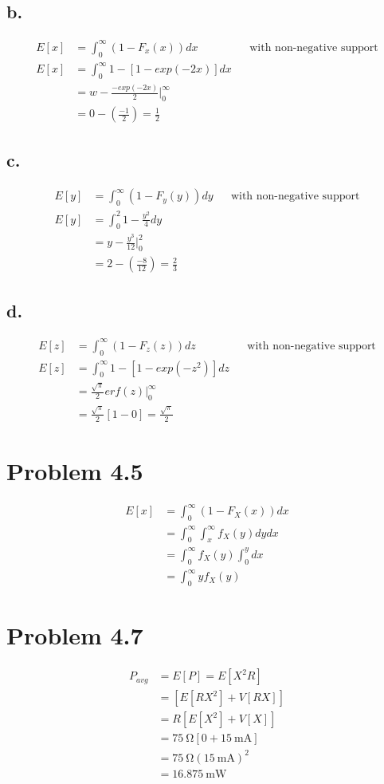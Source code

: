 \documentclass[12pt]{article}
\begin{document}
\subsection*{b.}
\begin{align*}
  E[x] &= \int_0^\infty (1-F_x(x))dx & & \textrm{with non-negative support} \\
  E[x] &= \int_0^\infty 1-[1-exp(-2x)]dx \\
  &= w - \frac{-exp(-2x)}{2}\big|_0^\infty \\
  &= 0 - (\frac{-1}{2}) = \frac{1}{2}
\end{align*}

\subsection*{c.}
\begin{align*}
  E[y] &= \int_0^\infty (1-F_y(y))dy & & \textrm{with non-negative support} \\
  E[y] &= \int_0^2 1-\frac{y^2}{4} dy \\
  &= y - \frac{y^3}{12}\big|_0^2 \\
  &= 2 - (\frac{-8}{12}) = \frac{2}{3}
\end{align*}

\subsection*{d.}
\begin{align*}
  E[z] &= \int_0^\infty (1-F_z(z))dz & & \textrm{with non-negative support} \\
  E[z] &= \int_0^\infty 1-[1-exp(-z^2)]dz \\
  &= \frac{\sqrt{\pi}}{2}erf(z)\big|_0^\infty \\
  &= \frac{\sqrt{\pi}}{2}[1-0] = \frac{\sqrt{\pi}}{2}
\end{align*}

\section*{Problem 4.5}
\begin{align*}
  E[x] &= \int_0^\infty (1-F_X(x))dx \\
  &= \int_0^\infty \int_x^\infty f_X(y)dydx \\
  &= \int_0^\infty f_X(y) \int_0^y dx \\
  &= \int_0^\infty yf_X(y)
\end{align*}  
\section*{Problem 4.7}
\begin{align*}
  P_{avg} &= E[P] = E[X^2R] \\
&= \left[E[RX^2] + V[RX]\right] \\
&= R\left[E[X^2] + V[X]\right] \\
&= \SI{75}{\ohm}\left[0 + \SI{15}{\milli\ampere}\right] \\
&= \SI{75}{\ohm}(\SI{15}{\milli\ampere})^2 \\
&= \SI{16.875}{\milli\watt} \\
\end{align*}
\end{document}
